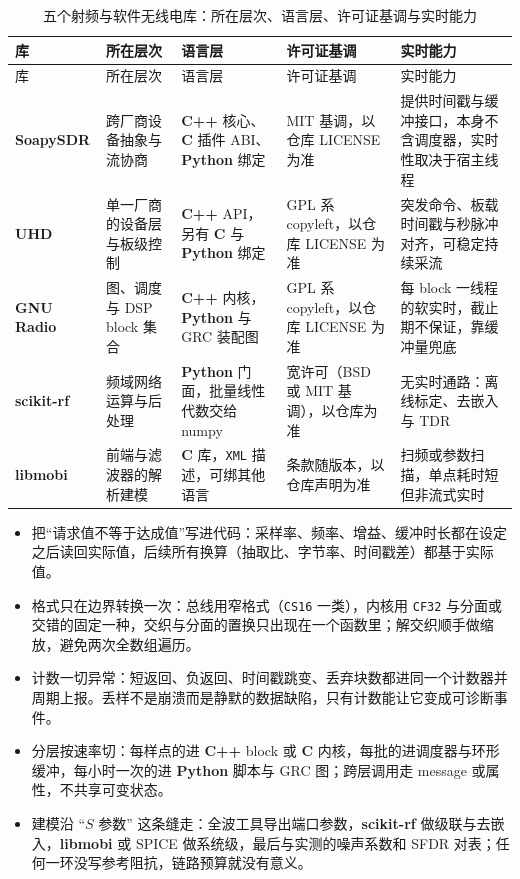 \documentclass[12pt,a4paper,fontset=fandol]{ctexbook}
\newcommand{\Tp}[1]{\texttt{#1}}
\newcommand{\Lib}[1]{\textbf{#1}}
\newcommand{\Lang}[1]{\textsf{\bfseries #1}}
\newcommand{\CL}{\Lang{C}}
\newcommand{\CPP}{\Lang{C++}}
\newcommand{\PY}{\Lang{Python}}
\begin{document}
\begin{longtable}{@{}>{\raggedright\arraybackslash}p{}
  >{\raggedright\arraybackslash}p{}
  >{\raggedright\arraybackslash}p{}
  >{\raggedright\arraybackslash}p{}
  >{\raggedright\arraybackslash}p{}@{}}
\caption{五个射频与软件无线电库：所在层次、语言层、许可证基调与实时能力}\label{tab:ch15-sdr}\\
\toprule
库 & 所在层次 & 语言层 & 许可证基调 & 实时能力 \\
\midrule
\endfirsthead
\toprule
库 & 所在层次 & 语言层 & 许可证基调 & 实时能力 \\
\midrule
\endhead
\Lib{SoapySDR} & 跨厂商设备抽象与流协商 &
  \CPP{} 核心、\CL{} 插件 ABI、\PY{} 绑定 &
  MIT 基调，以仓库 LICENSE 为准 &
  提供时间戳与缓冲接口，本身不含调度器，实时性取决于宿主线程 \\
\Lib{UHD} & 单一厂商的设备层与板级控制 &
  \CPP{} API，另有 \CL{} 与 \PY{} 绑定 &
  GPL 系 copyleft，以仓库 LICENSE 为准 &
  突发命令、板载时间戳与秒脉冲对齐，可稳定持续采流 \\
\Lib{GNU Radio} & 图、调度与 DSP block 集合 &
  \CPP{} 内核，\PY{} 与 GRC 装配图 &
  GPL 系 copyleft，以仓库 LICENSE 为准 &
  每 block 一线程的软实时，截止期不保证，靠缓冲量兜底 \\
\Lib{scikit-rf} & 频域网络运算与后处理 &
  \PY{} 门面，批量线性代数交给 numpy &
  宽许可（BSD 或 MIT 基调），以仓库为准 &
  无实时通路：离线标定、去嵌入与 TDR \\
\Lib{libmobi} & 前端与滤波器的解析建模 &
  \CL{} 库，\Tp{XML} 描述，可绑其他语言 &
  条款随版本，以仓库声明为准 &
  扫频或参数扫描，单点耗时短但非流式实时 \\
\end{longtable}

\begin{guideline}[title={本章要点}]
\begin{itemize}
\item 把``请求值不等于达成值''写进代码：采样率、频率、增益、缓冲时长都在设定之后读回实际值，后续所有换算（抽取比、字节率、时间戳差）都基于实际值。
\item 格式只在边界转换一次：总线用窄格式（\Tp{CS16} 一类），内核用 \Tp{CF32} 与分面或交错的固定一种，交织与分面的置换只出现在一个函数里；解交织顺手做缩放，避免两次全数组遍历。
\item 计数一切异常：短返回、负返回、时间戳跳变、丢弃块数都进同一个计数器并周期上报。丢样不是崩溃而是静默的数据缺陷，只有计数能让它变成可诊断事件。
\item 分层按速率切：每样点的进 \CPP{} block 或 \CL{} 内核，每批的进调度器与环形缓冲，每小时一次的进 \PY{} 脚本与 GRC 图；跨层调用走 message 或属性，不共享可变状态。
\item 建模沿 ``$S$ 参数'' 这条缝走：全波工具导出端口参数，\Lib{scikit-rf} 做级联与去嵌入，\Lib{libmobi} 或 SPICE 做系统级，最后与实测的噪声系数和 SFDR 对表；任何一环没写参考阻抗，链路预算就没有意义。
\end{itemize}
\end{guideline}
\end{document}

